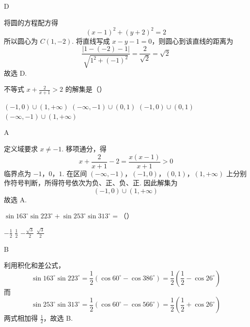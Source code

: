 \begin{answer}
D
\end{answer}

\begin{solution}
将圆的方程配方得
\[
\left(x-1\right)^2+\left(y+2\right)^2=2\]
所以圆心为 \(C(1,-2)\). 将直线写成 \(x-y-1=0\)，则圆心到该直线的距离为
\[
\frac{\left|1-(-2)-1\right|}{\sqrt{1^2+(-1)^2}}=\frac{2}{\sqrt{2}}=\sqrt{2}\]
故选 D.
\end{solution}

\begin{problem}
不等式 \(x+\frac{2}{x+1}>2\) 的解集是（\quad）

\choices
    {\(\left(-1,0\right)\cup\left(1,+\infty\right)\)}
    {\(\left(-\infty,-1\right)\cup\left(0,1\right)\)}
    {\(\left(-1,0\right)\cup\left(0,1\right)\)}
    {\(\left(-\infty,-1\right)\cup\left(1,+\infty\right)\)}
\end{problem}

\begin{answer}
A
\end{answer}

\begin{solution}
定义域要求 \(x\neq-1\). 移项通分，得
\[
x+\frac{2}{x+1}-2=\frac{x(x-1)}{x+1}>0\]
临界点为 \(-1\)，\(0\)，\(1\). 在区间 \(\left(-\infty,-1\right)\)，\(\left(-1,0\right)\)，\(\left(0,1\right)\)，\(\left(1,+\infty\right)\) 上分别作符号判断，所得符号依次为负、正、负、正. 因此解集为
\[
\left(-1,0\right)\cup\left(1,+\infty\right)
\]
故选 A.
\end{solution}

\begin{problem}
\(\sin163^{\circ}\sin223^{\circ}+\sin253^{\circ}\sin313^{\circ}=\)（\quad）

\choices
    {\(-\frac{1}{2}\)}
    {\(\frac{1}{2}\)}
    {\(-\frac{\sqrt{3}}{2}\)}
    {\(\frac{\sqrt{3}}{2}\)}
\end{problem}

\begin{answer}
B
\end{answer}

\begin{solution}
利用积化和差公式，
\[
\sin163^{\circ}\sin223^{\circ}=\frac{1}{2}\left(\cos60^{\circ}-\cos386^{\circ}\right)=\frac{1}{2}\left(\frac{1}{2}-\cos26^{\circ}\right)
\]
而
\[
\sin253^{\circ}\sin313^{\circ}=\frac{1}{2}\left(\cos60^{\circ}-\cos566^{\circ}\right)=\frac{1}{2}\left(\frac{1}{2}+\cos26^{\circ}\right)\]
两式相加得 \(\frac{1}{2}\)，故选 B.
\end{solution}

